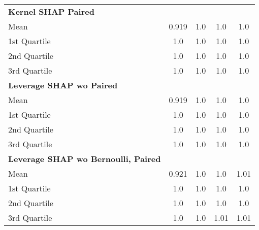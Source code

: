 {\begin{tabular} {lcccc}
\addlinespace[1ex] 
\textbf{Kernel SHAP Paired} &  &  &  &  \\ 
\hspace{7pt}Mean & 0.919 & 1.0 & 1.0 & \cellcolor{bronze!60}1.0 \\ 
\hspace{7pt}1st Quartile & 1.0 & 1.0 & 1.0 & \cellcolor{silver!60}1.0 \\ 
\hspace{7pt}2nd Quartile & 1.0 & 1.0 & 1.0 & \cellcolor{bronze!60}1.0 \\ 
\hspace{7pt}3rd Quartile & 1.0 & 1.0 & 1.0 & \cellcolor{bronze!60}1.0 \\ 
\addlinespace[1ex] 
\textbf{Leverage SHAP wo Paired} &  &  &  &  \\ 
\hspace{7pt}Mean & \cellcolor{bronze!60}0.919 & \cellcolor{gold!60}1.0 & \cellcolor{gold!60}1.0 & 1.0 \\ 
\hspace{7pt}1st Quartile & \cellcolor{gold!60}1.0 & \cellcolor{gold!60}1.0 & \cellcolor{bronze!60}1.0 & 1.0 \\ 
\hspace{7pt}2nd Quartile & \cellcolor{bronze!60}1.0 & \cellcolor{gold!60}1.0 & \cellcolor{gold!60}1.0 & 1.0 \\ 
\hspace{7pt}3rd Quartile & \cellcolor{gold!60}1.0 & \cellcolor{gold!60}1.0 & \cellcolor{silver!60}1.0 & 1.0 \\ 
\addlinespace[1ex] 
\textbf{Leverage SHAP wo Bernoulli, Paired} &  &  &  &  \\ 
\hspace{7pt}Mean & 0.921 & 1.0 & 1.0 & 1.01 \\ 
\hspace{7pt}1st Quartile & 1.0 & 1.0 & 1.0 & 1.0 \\ 
\hspace{7pt}2nd Quartile & 1.0 & 1.0 & 1.0 & 1.0 \\ 
\hspace{7pt}3rd Quartile & 1.0 & 1.0 & 1.01 & 1.01 \\ 
\bottomrule
\end{tabular}}